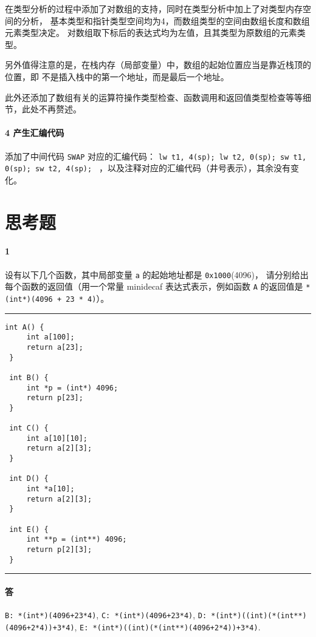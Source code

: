 \documentclass[UTF8]{ctexart}
\newcommand{\T}[1]{\texttt{{#1}}}
\begin{document}
            在类型分析的过程中添加了对数组的支持，同时在类型分析中加上了对类型内存空间的分析，
            基本类型和指针类型空间均为4，而数组类型的空间由数组长度和数组元素类型决定。
            对数组取下标后的表达式均为左值，且其类型为原数组的元素类型。

            另外值得注意的是，在栈内存（局部变量）中，数组的起始位置应当是靠近栈顶的位置，即
            不是插入栈中的第一个地址，而是最后一个地址。

            此外还添加了数组有关的运算符操作类型检查、函数调用和返回值类型检查等等细节，此处不再赘述。

            \paragraph{4 产生汇编代码} 添加了中间代码 \T{SWAP} 对应的汇编代码：
            \T{lw t1, 4(sp); lw t2, 0(sp); sw t1, 0(sp); sw t2, 4(sp); }
            ，以及注释对应的汇编代码（井号表示），其余没有变化。
        
    \section{思考题}
        \paragraph{1} 设有以下几个函数，其中局部变量 \T{a} 的起始地址都是 \T{0x1000}(4096)，
        请分别给出每个函数的返回值（用一个常量 minidecaf 表达式表示，例如函数 \T{A} 的返回值是 \T{*(int*)(4096 + 23 * 4)}）。

        \noindent\rule{\textwidth}{1pt}
        \begin{lstlisting}[style=lfonts]
 int A() {
     int a[100];
     return a[23];
 }

 int B() {
     int *p = (int*) 4096;
     return p[23];
 }

 int C() {
     int a[10][10];
     return a[2][3];
 }

 int D() {
     int *a[10];
     return a[2][3];
 }

 int E() {
     int **p = (int**) 4096;
     return p[2][3];
 }
        \end{lstlisting}
        \noindent\rule{\textwidth}{1pt}

        \paragraph{答} \T{B: *(int*)(4096+23*4)}, 
        \T{C: *(int*)(4096+23*4)}, 
        \T{D: *(int*)((int)(*(int**)(4096+2*4))+3*4)},
        \T{E: *(int*)((int)(*(int**)(4096+2*4))+3*4)}.
\end{document}
